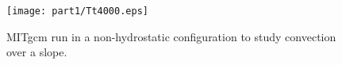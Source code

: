 \begin{figure}
\begin{center}
  \texttt{[image: part1/Tt4000.eps]}
\end{center}
\caption{MITgcm run in a non-hydrostatic configuration
to study convection over a slope.}
\label{fig:convect-and-topo}
\end{figure}
